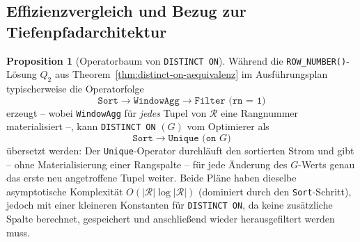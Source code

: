 ﻿\documentclass[a4paper,12pt]{report}
\theoremstyle{definition}
\newtheorem{proposition}[theorem]{Proposition}
\theoremstyle{remark}
\newcommand{\R}{\mathcal{R}}
\begin{document}
\subsection{Effizienzvergleich und Bezug zur Tiefenpfadarchitektur}
\label{sec:distinct-on-effizienz}

\begin{proposition}[Operatorbaum von \texttt{DISTINCT ON}]
\label{prop:distinct-on-plan}
Während die \texttt{ROW\_NUMBER()}-Lösung $Q_2$ aus
Theorem~\ref{thm:distinct-on-aequivalenz} im Ausführungsplan
typischerweise die Operatorfolge
\[
  \texttt{Sort} \to \texttt{WindowAgg} \to \texttt{Filter (rn = 1)}
\]
erzeugt -- wobei \texttt{WindowAgg} für \emph{jedes} Tupel von $\R$
eine Rangnummer materialisiert --, kann \texttt{DISTINCT ON} $(G)$ vom
Optimierer als
\[
  \texttt{Sort} \to \texttt{Unique (on } G\texttt{)}
\]
übersetzt werden: Der \texttt{Unique}-Operator durchläuft den
sortierten Strom und gibt -- ohne Materialisierung einer
Rangspalte -- für jede Änderung des $G$-Werts genau das erste neu
angetroffene Tupel weiter. Beide Pläne haben dieselbe asymptotische
Komplexität $O(|\R|\log|\R|)$ (dominiert durch den
\texttt{Sort}-Schritt), jedoch mit einer kleineren Konstanten für
\texttt{DISTINCT ON}, da keine zusätzliche Spalte berechnet,
gespeichert und anschließend wieder herausgefiltert werden muss.
\end{proposition}
\end{document}
